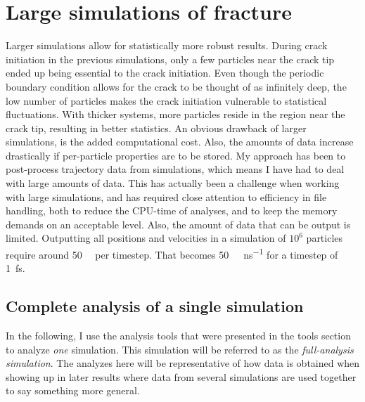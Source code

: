 \section{Large simulations of fracture}
Larger simulations allow for statistically more robust results. During crack initiation in the previous simulations, only a few particles near the crack tip ended up being essential to the crack initiation. Even though the periodic boundary condition allows for the crack to be thought of as infinitely deep, the low number of particles makes the crack initiation vulnerable to statistical fluctuations. With thicker systems, more particles reside in the region near the crack tip, resulting in better statistics. An obvious drawback of larger simulations, is the added computational cost. Also, the amounts of data increase drastically if per-particle properties are to be stored. My approach has been to post-process trajectory data from simulations, which means I have had to deal with large amounts of data. This has actually been a challenge when working with large simulations, and has required close attention to efficiency in file handling, both to reduce the CPU-time of analyses, and to keep the memory demands on an acceptable level. Also, the amount of data that can be output is limited. Outputting all positions and velocities in a simulation of $10^6$ particles require around \SI{50}{\mega\byte} per timestep. That becomes \SI{50}{\tera\byte\per\nano\second} for a timestep of \SI{1}{\femto\second}. 
\label{sec:complete_analysis_single_simulation}

\subsection{Complete analysis of a single simulation}
In the following, I use the analysis tools that were presented in the tools section to analyze \emph{one} simulation. This simulation will be referred to as the \emph{full-analysis simulation}. The analyzes here will be representative of how data is obtained when showing up in later results where data from several simulations are used together to say something more general.

